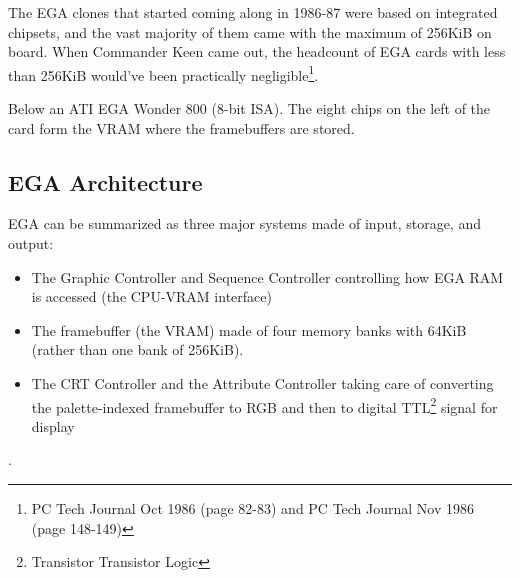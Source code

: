 \documentclass[book.tex]{subfiles}
\begin{document}
\par
The EGA clones that started coming along in 1986-87 were based on integrated chipsets, and the vast majority of them came with the maximum of 256KiB on board. When Commander Keen came out, the headcount of EGA cards with less than 256KiB would've been practically negligible\footnote{PC Tech Journal Oct 1986 (page 82-83) and PC Tech Journal Nov 1986 (page 148-149)}.\\

\par
Below an ATI EGA Wonder 800 (8-bit ISA). The eight chips on the left of the card form the VRAM where the framebuffers are stored. 

\begin{figure}[H] 
  \centering 
  
\end{figure}
\par
\pagebreak




\subsection{EGA Architecture}

EGA can be summarized as three major systems made of input, storage, and output:
\begin{itemize}
\item The Graphic Controller and Sequence Controller controlling how EGA RAM is accessed (the CPU-VRAM interface)
\item The framebuffer (the VRAM) made of four memory banks with 64KiB (rather than one bank of 256KiB).  
\item The CRT Controller and the Attribute Controller taking care of converting the palette-indexed framebuffer to RGB and then to digital TTL\footnote{Transistor Transistor Logic} signal for display
\end{itemize}

\par
{}.\\
\end{document}
